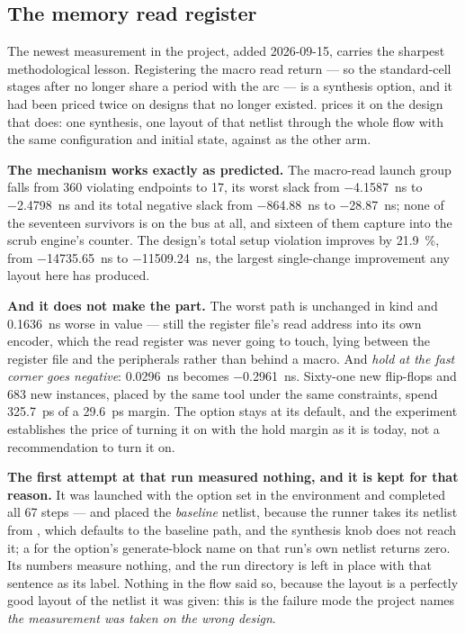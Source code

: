 \subsection{The memory read register}
\label{sec:phys-rdreg}

The newest measurement in the project, added 2026-09-15, carries the
sharpest methodological lesson. Registering the macro read return ---
so the standard-cell stages after  no longer share a
period with the arc --- is a synthesis option, and it had been priced
twice on designs that no longer existed.  prices
it on the design that does: one synthesis, one layout of that netlist
through the whole flow with the same configuration and initial state,
against  as the other arm.

\textbf{The mechanism works exactly as predicted.} The macro-read launch
group falls from 360 violating endpoints to 17, its worst slack from
\qty{-4.1587}{\nano\second} to \qty{-2.4798}{\nano\second} and its total
negative slack from \qty{-864.88}{\nano\second} to
\qty{-28.87}{\nano\second}; none of the seventeen survivors is on the
bus at all, and sixteen of them capture into the scrub engine's
counter. The
design's total setup violation improves by \qty{21.9}{\percent}, from
\qty{-14735.65}{\nano\second} to \qty{-11509.24}{\nano\second}, the
largest single-change improvement any layout here has produced.

\textbf{And it does not make the part.} The worst path is unchanged in
kind and \qty{0.1636}{\nano\second} worse in value --- still the
register file's read address into its own encoder, which the read register was never
going to touch, lying between the register file and the peripherals
rather than behind a macro. And \emph{hold at the fast corner goes
negative}: \qty{+0.0296}{\nano\second} becomes
\qty{-0.2961}{\nano\second}. Sixty-one new flip-flops and 683 new
instances, placed by the same tool under the same constraints, spend
\qty{325.7}{\pico\second} of a \qty{29.6}{\pico\second} margin. The
option stays at its default, and the experiment establishes the price of
turning it on with the hold margin as it is today, not a recommendation
to turn it on.

\textbf{The first attempt at that run measured nothing, and it is kept
for that reason.} It was launched with the option set in the environment
and completed all 67 steps --- and placed the \emph{baseline} netlist,
because the runner takes its netlist from , which
defaults to the baseline path, and the synthesis knob does not reach it;
a  for the option's generate-block name on that run's own
netlist returns zero. Its numbers measure nothing, and the run directory
is left in place with that sentence as its label. Nothing in the flow
said so, because the layout is a perfectly good layout of the netlist it
was given: this is the failure mode the project names \emph{the
measurement was taken on the wrong design}.


